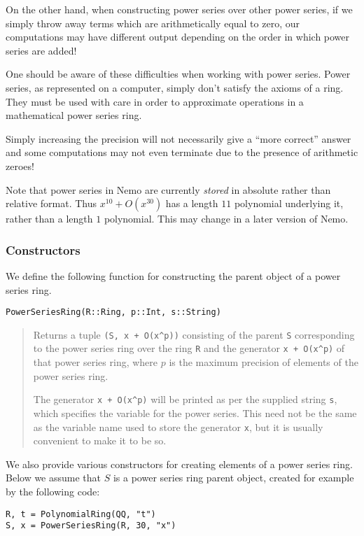 \documentclass[a4paper,10pt]{article}
\newcommand{\code}{\lstinline}
\newcommand{\desc}[1]{\vspace{-3mm}\begin{quote}#1\end{quote}}
\begin{document}
On the other hand, when constructing power series over other power series, if
we simply throw away terms which are arithmetically equal to zero, our
computations may have different output depending on the order in which
power series are added!

One should be aware of these difficulties when working with power series.
Power series, as represented on a computer, simply don't satisfy the axioms
of a ring. They must be used with care in order to approximate operations in
a mathematical power series ring.

Simply increasing the precision will not necessarily give a ``more correct''
answer and some computations may not even terminate due to the presence of
arithmetic zeroes!

Note that power series in Nemo are currently \emph{stored} in absolute 
rather than relative format. Thus $x^10 + O(x^30)$ has a length $11$
polynomial underlying it, rather than a length $1$ polynomial. This may
change in a later version of Nemo.

\subsubsection{Constructors}

We define the following function for constructing the parent object of a
power series ring.

\begin{lstlisting}
PowerSeriesRing(R::Ring, p::Int, s::String)
\end{lstlisting}

\desc{Returns a tuple \code{(S, x + O(x^p))} consisting of the parent \code{S} 
corresponding to the power series ring over the ring \code{R} and the generator
\code{x + O(x^p)} of that power series ring, where $p$ is the maximum precision
of elements of the power series ring.

The generator \code{x + O(x^p)} will be printed as per the supplied string
\code{s}, which specifies the variable for the power series. This need not be the
same as the variable name used to store the generator \code{x}, but it is usually
convenient to make it to be so.}

We also provide various constructors for creating elements of a power series
ring. Below we assume that $S$ is a power series ring parent object, created
for example by the following code:

\begin{lstlisting}
R, t = PolynomialRing(QQ, "t")
S, x = PowerSeriesRing(R, 30, "x")
\end{lstlisting}
\end{document}
